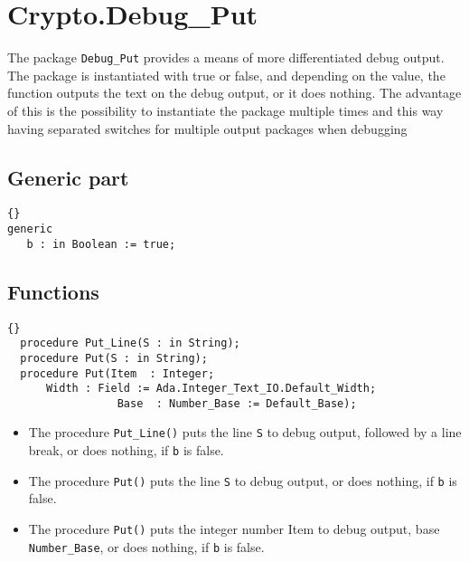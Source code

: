 \chapter{Crypto.Debug\_Put}
The package \texttt{Debug\_Put} provides a means of more differentiated debug output. The package is instantiated with true or false, and depending on the value, the function outputs the text on the debug output, or it does nothing. \linebreak
The advantage of this is the possibility to instantiate the package multiple times and this way having separated switches for multiple output packages when debugging
\section{Generic part}
\begin{lstlisting}{}
generic
   b : in Boolean := true;
\end{lstlisting}
\section{Functions}
\begin{lstlisting}{}
  procedure Put_Line(S : in String);
  procedure Put(S : in String);
  procedure Put(Item  : Integer;
      Width : Field := Ada.Integer_Text_IO.Default_Width;
                 Base  : Number_Base := Default_Base);
\end{lstlisting}
\begin{itemize}
	\item The procedure \texttt{Put\_Line()} puts the line \texttt{S} to debug output, followed by a line break, or does nothing, if \texttt{b} is false.
	\item The procedure \texttt{Put()} puts the line \texttt{S} to debug output, or does nothing, if \texttt{b} is false.
	\item The procedure \texttt{Put()} puts the integer number Item to debug output, base \texttt{Number\_Base}, or does nothing, if \texttt{b} is false.
\end{itemize}
